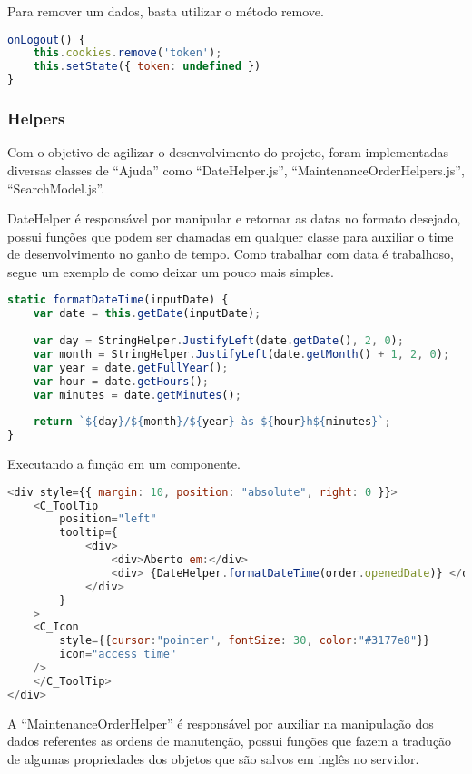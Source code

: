Para remover um dados, basta utilizar o método remove.

\begin{lstlisting}[language=JavaScript, caption={Recuperar dados do cookie}]
onLogout() {
	this.cookies.remove('token');
	this.setState({ token: undefined })
}
\end{lstlisting}

\subsubsection{Helpers}
Com o objetivo de agilizar o desenvolvimento do projeto, foram implementadas diversas classes de ``Ajuda'' como ``DateHelper.js'', ``MaintenanceOrderHelpers.js'', ``SearchModel.js''.

DateHelper é responsável por manipular e retornar as datas no formato desejado, possui funções que podem ser chamadas em qualquer classe para auxiliar o time de desenvolvimento no ganho de tempo. Como trabalhar com data é trabalhoso, segue um exemplo de como deixar um pouco mais simples.

\begin{lstlisting}[language=JavaScript, caption={Função que formata a data em dia/mês/ano - horas/minutos}]
static formatDateTime(inputDate) {
	var date = this.getDate(inputDate);
	
	var day = StringHelper.JustifyLeft(date.getDate(), 2, 0);
	var month = StringHelper.JustifyLeft(date.getMonth() + 1, 2, 0);
	var year = date.getFullYear();
	var hour = date.getHours();
	var minutes = date.getMinutes();
	
	return `${day}/${month}/${year} às ${hour}h${minutes}`;
}
\end{lstlisting}

Executando a função em um componente.

\begin{lstlisting}[language=JavaScript, caption={Utilizando a função de formatação de data hora}]
<div style={{ margin: 10, position: "absolute", right: 0 }}>
	<C_ToolTip
		position="left" 
		tooltip={
			<div>                          
				<div>Aberto em:</div>
				<div> {DateHelper.formatDateTime(order.openedDate)} </div>
			</div>
		}
	>
	<C_Icon
		style={{cursor:"pointer", fontSize: 30, color:"#3177e8"}}
		icon="access_time"
	/>
	</C_ToolTip>
</div>
\end{lstlisting}



A ``MaintenanceOrderHelper'' é responsável por auxiliar na manipulação dos dados referentes as ordens de manutenção, possui funções que fazem a tradução de algumas propriedades dos objetos que são salvos em inglês no servidor.

